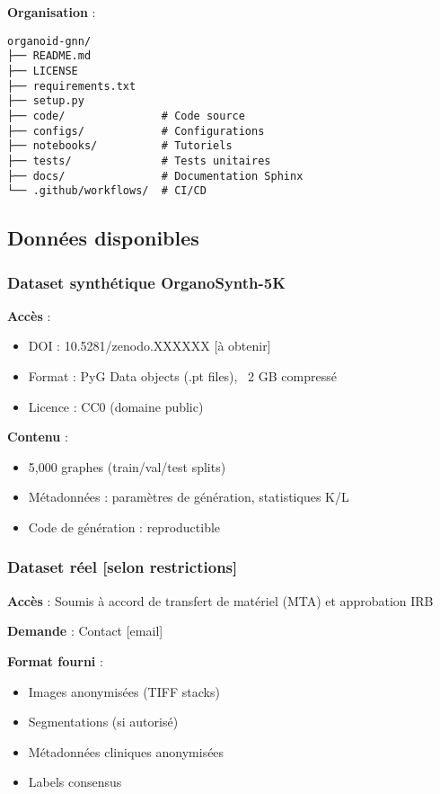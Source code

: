 \textbf{Organisation} :
\begin{verbatim}
organoid-gnn/
├── README.md
├── LICENSE
├── requirements.txt
├── setup.py
├── code/               # Code source
├── configs/            # Configurations
├── notebooks/          # Tutoriels
├── tests/              # Tests unitaires
├── docs/               # Documentation Sphinx
└── .github/workflows/  # CI/CD
\end{verbatim}

\subsection{Données disponibles}

\subsubsection{Dataset synthétique OrganoSynth-5K}

\textbf{Accès} :
\begin{itemize}
    \item DOI : 10.5281/zenodo.XXXXXX [à obtenir]
    \item Format : PyG Data objects (.pt files), ~2 GB compressé
    \item Licence : CC0 (domaine public)
\end{itemize}

\textbf{Contenu} :
\begin{itemize}
    \item 5,000 graphes (train/val/test splits)
    \item Métadonnées : paramètres de génération, statistiques K/L
    \item Code de génération : reproductible
\end{itemize}

\subsubsection{Dataset réel [selon restrictions]}

\textbf{Accès} : Soumis à accord de transfert de matériel (MTA) et approbation IRB

\textbf{Demande} : Contact [email]

\textbf{Format fourni} :
\begin{itemize}
    \item Images anonymisées (TIFF stacks)
    \item Segmentations (si autorisé)
    \item Métadonnées cliniques anonymisées
    \item Labels consensus
\end{itemize}

